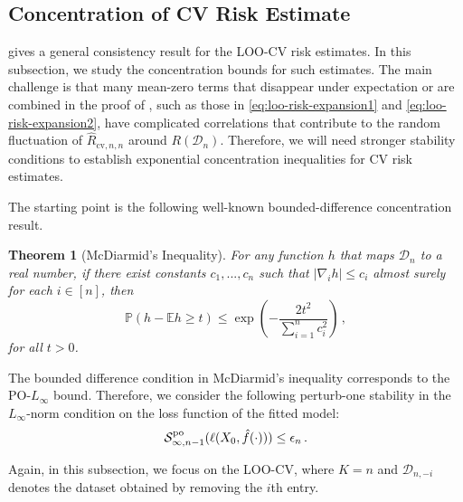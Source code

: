 \documentclass[11pt]{article}
\theoremstyle{plain}
\newtheorem{theorem}{Theorem}[section]
\newcommand{\cv}{{\mathrm{cv}}}
\newcommand{\D}{{\mathcal{D}}}
\renewcommand{\S}{{\mathcal{S}}}
\begin{document}
\subsection{Concentration of CV Risk Estimate}\label{subsec:bousquet_concentration}
 gives a general consistency result for the LOO-CV risk estimates. In this subsection, we study the concentration bounds for such estimates.  The main challenge is that many mean-zero terms that disappear under expectation or are combined in the proof of , such as those in \eqref{eq:loo-risk-expansion1} and \eqref{eq:loo-risk-expansion2}, have complicated correlations that contribute to the random fluctuation of $\hat R_{\cv,n,n}$ around $R(\D_n)$.  Therefore, we will need stronger stability conditions to establish exponential concentration inequalities for CV risk estimates.

The starting point is the following well-known bounded-difference concentration result.
\begin{theorem}[McDiarmid's Inequality]\label{thm:mcdiarmid}
For any function $h$ that maps $\D_n$ to a real number, if 
there exist constants $c_1,...,c_n$ such that $|\nabla_i h|\le c_i$ almost surely for each $i\in[n]$, then
$$\mathbb P(h-\mathbb E h\ge t)\le \exp\left(-\frac{2t^2}{\sum_{i=1}^n c_i^2}\right)\,,$$
for all $t>0$.
\end{theorem}

The bounded difference condition in McDiarmid's inequality corresponds to the PO-$L_\infty$ bound.
Therefore, we consider the following perturb-one stability in the $L_\infty$-norm condition on the loss function of the fitted model:
\begin{equation}\label{eq:PO_infty_bound}
\S_{\infty,n-1}^{\rm po}(\ell(X_0,\hat f(\cdot))) \le \epsilon_n\,.    
\end{equation}

Again, in this subsection, we focus on the LOO-CV, where $K=n$ and $\D_{n,-i}$ denotes the dataset obtained by removing the $i$th entry.
\end{document}
